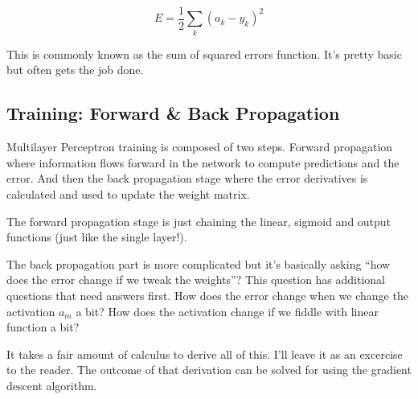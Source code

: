 \documentclass[letterpaper,12pt]{article}
\begin{document}
\[
    E = \frac{1}{2} \sum_{k} {(a_k - y_k)}^2
\]

This is commonly known as the sum of squared errors function. It's pretty basic
but often gets the job done.

\subsection{Training: Forward \& Back Propagation}

Multilayer Perceptron training is composed of two steps. Forward propagation
where information flows forward in the network to compute predictions and the
error. And then the back propagation stage where the error derivatives is
calculated and used to update the weight matrix.

The forward propagation stage is just chaining the linear, sigmoid and output
functions (just like the single layer!).

The back propagation part is more complicated but it's basically asking ``how
does the error change if we tweak the weights''? This question has additional
questions that need answers first. How does the error change when we change
the activation $a_m$ a bit?  How does the activation change if we fiddle with
linear function a bit?

It takes a fair amount of calculus to derive all of this. I'll leave it as an
excercise to the reader. The outcome of that derivation can be solved for using
the gradient descent algorithm.
\end{document}
